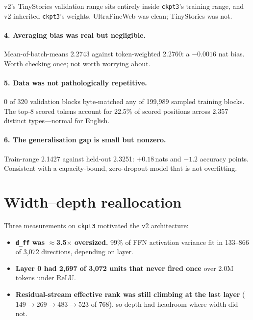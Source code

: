 \documentclass[11pt,a4paper]{article}
\newcommand{\dff}{\texttt{d\_ff}}
\newcommand{\nats}[1]{\ensuremath{#1}\,nats}
\begin{document}
v2's TinyStories validation range sits entirely inside \texttt{ckpt3}'s training range, and v2
inherited \texttt{ckpt3}'s weights. UltraFineWeb was clean; TinyStories was not.

\paragraph{4. Averaging bias was real but negligible.} Mean-of-batch-means 2.2743 against
token-weighted 2.2760: a $-0.0016$ nat bias. Worth checking once; not worth worrying about.

\paragraph{5. Data was not pathologically repetitive.} 0 of 320 validation blocks byte-matched
any of 199{,}989 sampled training blocks. The top-8 scored tokens account for 22.5\% of scored
positions across 2{,}357 distinct types---normal for English.

\paragraph{6. The generalisation gap is small but nonzero.} Train-range 2.1427 against held-out
2.3251: \nats{{+}0.18} and $-1.2$ accuracy points. Consistent with a capacity-bound,
zero-dropout model that is not overfitting.

\section{Width--depth reallocation}\label{sec:width}

Three measurements on \texttt{ckpt3} motivated the v2 architecture:

\begin{itemize}
\item \textbf{\dff{} was $\approx$3.5$\times$ oversized.} 99\% of FFN activation variance fit in
133--866 of 3{,}072 directions, depending on layer.
\item \textbf{Layer 0 had 2{,}697 of 3{,}072 units that never fired once} over 2.0M tokens under
ReLU.
\item \textbf{Residual-stream effective rank was still climbing at the last layer}
($149 \to 269 \to 483 \to 523$ of 768), so depth had headroom where width did not.
\end{itemize}
\end{document}

